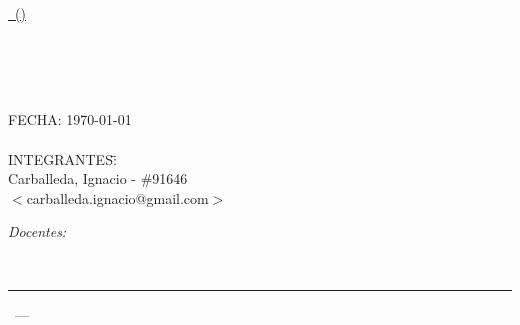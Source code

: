 \begin{titlepage}
\begin{center}
\end{center}

\vfill

\begin{center}
\underline{\Large{\nombreMateria\, (\codigoMateria)}}
\end{center}

\vfill
\begin{center}

\end{center}
\vfill

\begin{center}
	\begin{figure}[H]
		\centering
	\end{figure}\HRule \\[0.1cm]
\Huge{\textbf{\descripcionTP}}\\[0.01cm]
\HRule\\[0.3cm]
\end{center}

\vfill



\begin{tabbing}
	FECHA: \today\\
\\
	INTEGRANTES:\hspace{-1cm}\=\+\hspace{1cm}\=\hspace{6cm}\=\\
		Carballeda, Ignacio	\>\>- \#91646\\
			\>\footnotesize{$<$carballeda.ignacio@gmail.com$>$}\\
\end{tabbing}

\begin{flushleft} \large
\emph{Docentes:}\\[.2cm]
\end{flushleft}
\begin{tabbing}
\docentes\\[.5cm]
\end{tabbing}

\vfill

\hrule
\vspace{0.2cm}

\noindent\small{\codigoMateria\, --- \nombreMateria \hfill \facultad}

\end{titlepage}
